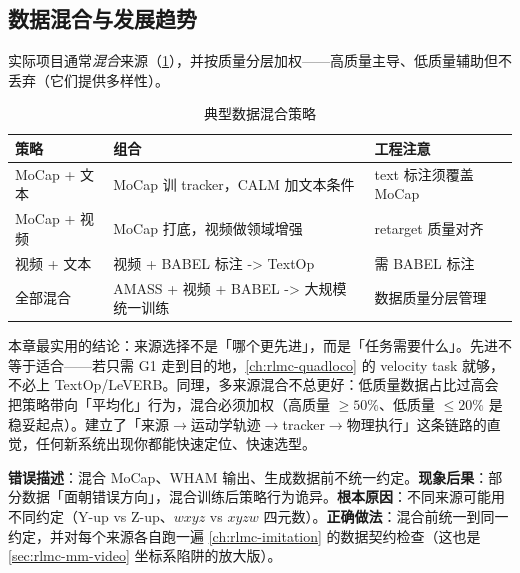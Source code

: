\subsection{数据混合与发展趋势}
\label{sec:rlmc-mm-choose-mix}

实际项目通常\emph{混合}来源（\cref{tab:rlmc-mm-mix}），并按质量分层加权——高质量主导、低质量辅助但不丢弃（它们提供多样性）。

\begin{table}[ht]
\centering
\small
\caption{典型数据混合策略}
\label{tab:rlmc-mm-mix}
\begin{tabular}{@{}llp{4.2cm}@{}}
\toprule
策略 & 组合 & 工程注意 \\
\midrule
MoCap + 文本 & MoCap 训 tracker，CALM 加文本条件 & text 标注须覆盖 MoCap \\
MoCap + 视频 & MoCap 打底，视频做领域增强 & retarget 质量对齐 \\
视频 + 文本 & 视频 + BABEL 标注 -> TextOp & 需 BABEL 标注 \\
全部混合 & AMASS + 视频 + BABEL -> 大规模统一训练 & 数据质量分层管理 \\
\bottomrule
\end{tabular}
\end{table}

\begin{insight}\label{ins:rlmc-mm-choose}
本章最实用的结论：来源选择不是「哪个更先进」，而是「任务需要什么」。先进不等于适合——若只需 G1 走到目的地，\cref{ch:rlmc-quadloco} 的 velocity task 就够，不必上 TextOp/LeVERB。同理，多来源混合不总更好：低质量数据占比过高会把策略带向「平均化」行为，混合必须加权（高质量 $\ge 50\%$、低质量 $\le 20\%$ 是稳妥起点）。建立了「来源$\to$运动学轨迹$\to$tracker$\to$物理执行」这条链路的直觉，任何新系统出现你都能快速定位、快速选型。
\end{insight}

\begin{pitfall}
\textbf{错误描述}：混合 MoCap、WHAM 输出、生成数据前不统一约定。\textbf{现象后果}：部分数据「面朝错误方向」，混合训练后策略行为诡异。\textbf{根本原因}：不同来源可能用不同约定（Y-up vs Z-up、$wxyz$ vs $xyzw$ 四元数）。\textbf{正确做法}：混合前统一到同一约定，并对每个来源各自跑一遍 \cref{ch:rlmc-imitation} 的数据契约检查（这也是 \cref{sec:rlmc-mm-video} 坐标系陷阱的放大版）。
\end{pitfall}

